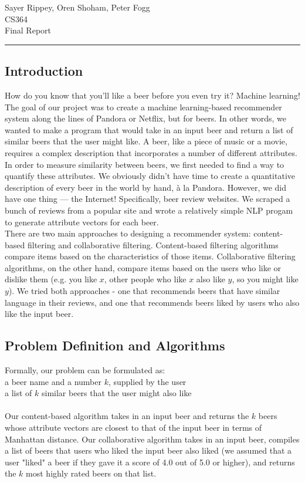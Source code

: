\documentclass[11pt]{article}
\renewcommand{\maketitle}{
  \begin{center}
    \begin{flushright}
      Sayer Rippey, Oren Shoham, Peter Fogg \\
      CS364 \\
      Final Report
    \end{flushright}
    \rule{\linewidth}{0.1mm}
  \end{center}
}
\begin{document}
\maketitle
\subsection*{Introduction}
How do you know that you'll like a beer before you even try it? Machine learning! The goal of our project was to create a machine learning-based recommender system along the lines of Pandora or Netflix, but for beers. In other words, we wanted to make a program that would take in an input beer and return a list of similar beers that the user might like. A beer, like a piece of music or a movie, requires a complex description that incorporates a number of different attributes. In order to measure similarity between beers, we first needed to find a way to quantify these attributes. We obviously didn't have time to create a quantitative description of every beer in the world by hand, \`{a} la Pandora. However, we did have one thing --- the Internet! Specifically, beer review websites. We scraped a bunch of reviews from a popular site and wrote a relatively simple NLP progam to generate attribute vectors for each beer.  \\
\indent There are two main approaches to designing a recommender system: content-based filtering and collaborative filtering. Content-based filtering algorithms compare items based on the characteristics of those items. Collaborative filtering algorithms, on the other hand, compare items based on the users who like or dislike them (e.g. you like $x$, other people who like $x$ also like $y$, so you might like $y$). We tried both approaches - one that recommends beers that have similar language in their reviews, and one that recommends beers liked by users who also like the input beer.

\subsection*{Problem Definition and Algorithms}
Formally, our problem can be formulated as: \\
 a beer name and a number $k$, supplied by the user \\
 a list of $k$ similar beers that the user might also like \\
\\

Our content-based algorithm takes in an input beer and returns the $k$ beers whose attribute vectors are closest to that of the input beer in terms of Manhattan distance. Our collaborative algorithm takes in an input beer, compiles a list of beers that users who liked the input beer also liked (we assumed that a user "liked"  a beer if they gave it a score of 4.0 out of 5.0 or higher), and returns the $k$ most highly rated beers on that list.
\end{document}
